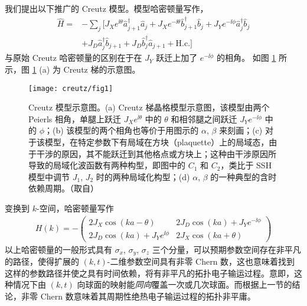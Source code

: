 我们提出以下推广的 Creutz 模型。模型哈密顿量写作，
\begin{align}
\hat{H} =&-\sum_{j} [J_X e^{\ii\theta} \hat{a}_{j+1}^\dag \hat{a}_{j}+J_X e^{-\ii\theta} \hat{b}_{j+1}^\dag \hat{b}_{j} + J_Y e^{-\ii\phi} \hat{a}_j^\dag \hat{b}_j 
\nonumber\\
&+ J_D \hat{a}_j^\dag \hat{b}_{j+1}+J_D \hat{b}_j^\dag \hat{a}_{j+1} +\textrm{H.c.}]
\end{align}
与原始 Creutz 哈密顿量的区别在于在 $J_Y$ 跃迁上加了 $e^{-\ii\phi}$ 的相角。
如图 \ref{fig:creutz:schematic} 所示，图 \ref{fig:creutz:schematic} (a) 为 Creutz 梯的示意图。
\begin{figure}[!htb]
\centering
\texttt{[image: creutz/fig1]}
\caption{Creutz 模型示意图。(a) Creutz 梯晶格模型示意图，该模型由两个 Peierls 相角，单腿上跃迁 $J_Xe^{\ii\theta}$ 中的 $\theta$ 和相邻腿之间跃迁 $J_Ye^{-\ii\phi}$ 中的 $\phi$；(b) 该模型的两个相角也等价于用图示的 $\alpha$, $\beta$ 来刻画；(c) 对于该模型，在特定参数下有局域在方块（plaquette）上的局域态，由于干涉的原因，其不能跃迁到其他格点或方块上\cite{creutz,creutz1999}；这种由干涉原因所导致的局域化波函数有两种构型，即图中的 $C_1$ 和 $C_2$，类比于 SSH 模型中调节 $J_1$, $J_2$ 时的两种局域化构型；(d) $\alpha$, $\beta$ 的一种典型的含时依赖周期。（取自）}
\label{fig:creutz:schematic}
\end{figure}
变换到 $k$-空间，哈密顿量写作
\begin{align}
H(k)=-\begin{pmatrix} 2 J_X \cos(ka-\theta)& 2 J_D\cos(ka)+J_Y e^{-\ii\phi}\\
2 J_D\cos(ka)+J_Y e^{\ii\phi}& 2 J_X \cos(ka+\theta)\end{pmatrix}
\end{align}
以上哈密顿量的一般形式具有 $\sigma_x$, $\sigma_y$, $\sigma_z$ 三个分量，可以预期参数空间存在非平凡的路径，使得扩展的 $(k,t)$-二维参数空间具有非零 Chern 数，这也意味着找到这样的参数路径并使之具有时间依赖，将有非平凡的拓扑电子输运过程。意即，这种情况下由 $(k,t)$ 向球面的映射能\textit{同向}覆盖一次或几次球面。而根据上一节的结论，非零 Chern 数意味着其周期性绝热电子输运过程的拓扑非平庸。

